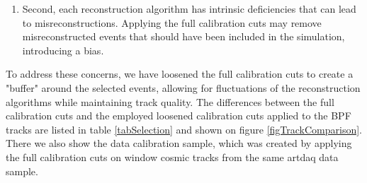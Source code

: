 \documentclass[12pt]{article}
\begin{document}
\begin{enumerate}
\begin{enumerate}
\item Second, each reconstruction algorithm has intrinsic deficiencies that can lead to misreconstructions. Applying the full calibration cuts may remove misreconstructed events that should have been included in the simulation, introducing a bias.
\end{enumerate}

To address these concerns, we have loosened the full calibration cuts to create a "buffer" around the selected events, allowing for fluctuations of the reconstruction algorithms while maintaining track quality. The differences between the full calibration cuts and the employed loosened calibration cuts applied to the BPF tracks are listed in table \ref{tabSelection} and shown on figure \ref{figTrackComparison}. There we also show the data calibration sample, which was created by applying the full calibration cuts on window cosmic tracks from the same artdaq data sample.
\end{enumerate}

\end{document}
